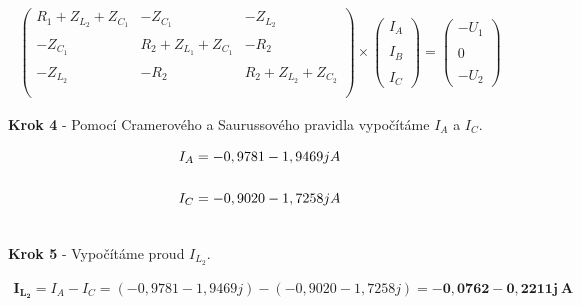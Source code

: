 \begin{gather*}
    \begin{pmatrix}
        R_1 + Z_{L_2} + Z_{C_1} & -Z_{C_1} & -Z_{L_2} \\\\
        -Z_{C_1} & R_2 + Z_{L_1} + Z_{C_1} & -R_2 \\\\
        -Z_{L_2} & -R_2 & R_2 + Z_{L_2} + Z_{C_2} \\\\
    \end{pmatrix}
    \times
    \begin{pmatrix}
        I_A \\\\
        I_B \\\\
        I_C
    \end{pmatrix}
    =
    \begin{pmatrix}
        -U_1 \\\\
        0 \\\\
        -U_2
    \end{pmatrix}
\end{gather*}
\vspace{0.5cm}

\begin{center}
\textbf{Krok 4} - Pomocí Cramerového a Saurussového pravidla vypočítáme $I_A$ a $I_C$. \\
\end{center}

\begin{gather*}
I_A = -0,9781 - 1,9469j A \\\\
\newline
\newline
I_C = -0,9020 - 1,7258j A \\\\
\end{gather*}

\newpage

\begin{center}
\textbf{Krok 5} - Vypočítáme proud $I_{L_2}$. \\
\end{center}
\vspace{-0.5cm}

\begin{gather*}
\boldsymbol{I_{L_2}} = I_A - I_C = (-0,9781 - 1,9469j) - (-0,9020 - 1,7258j) = \boldsymbol{-0,0762 - 0,2211j\ A}\\\\
\end{gather*}

